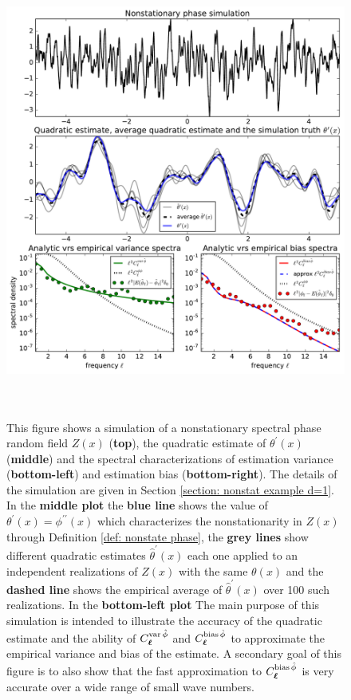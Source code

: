 \documentclass[10pt,noinfoline]{imsart}
\newcommand{\bs}{\boldsymbol}
\begin{document}
\begin{figure}
\includegraphics[height=15cm]{figure2.pdf}%
\caption{ This figure shows a simulation of a nonstationary spectral phase random field $Z(x)$ (\textbf{top}), the quadratic estimate of  $\theta^\prime(x)$ (\textbf{middle}) and the spectral characterizations of estimation variance (\textbf{bottom-left}) and estimation bias (\textbf{bottom-right}). The details of the simulation are given in Section \ref{section: nonstat example d=1}. In the \textbf{middle plot} the \textbf{blue line} shows the value of $\theta^\prime(x)=\phi^{\prime\prime}(x)$ which characterizes the nonstationarity in $Z(x)$ through Definition \ref{def: nonstate phase}, the  \textbf{grey lines} show different quadratic estimates $\hat\theta^\prime(x)$ each one applied to an independent realizations of $Z(x)$ with the same $\theta(x)$ and the \textbf{dashed line} shows the empirical average of $\hat\theta^\prime(x)$ over 100 such realizations. In the \textbf{bottom-left plot}
The main purpose of this simulation is intended to illustrate the accuracy of the quadratic estimate and the ability of $C^{\text{var\,}\hat\phi}_{\bs \ell}$ and $C^{\text{bias\,}\hat\phi}_{\bs \ell}$ to approximate the empirical variance and bias of the estimate. A secondary goal of this figure is to also show that the fast approximation to $C^{\text{bias\,}\hat\phi}_{\bs \ell}$ is very accurate over a wide range of small wave numbers.}
\label{Figure 2 zx and var}
\end{figure}
\end{document}
